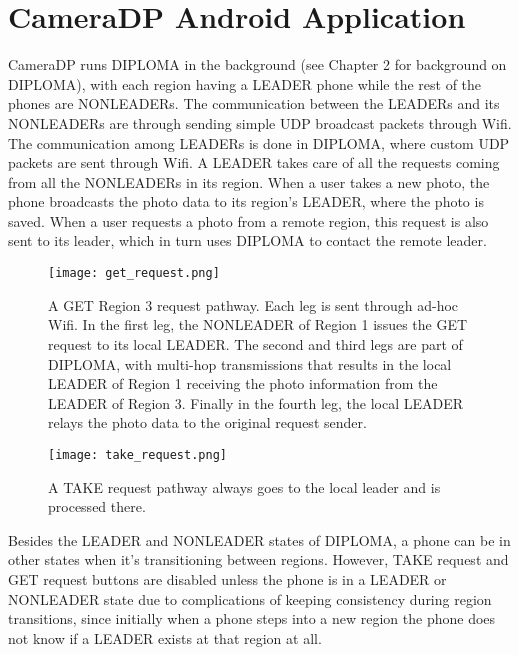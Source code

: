 \chapter{CameraDP Android Application}

CameraDP runs DIPLOMA in the background (see Chapter 2 for background on DIPLOMA), with each region having a LEADER phone while the rest of the phones are NONLEADERs. The communication between the LEADERs and its NONLEADERs are through sending simple UDP broadcast packets through Wifi. The communication among LEADERs is done in DIPLOMA, where custom UDP packets are sent through Wifi. A LEADER takes care of all the requests coming from all the NONLEADERs in its region.  When a user takes a new photo, the phone broadcasts the photo data to its region's LEADER, where the photo is saved. When a user requests a photo from a remote region, this request is also sent to its leader, which in turn uses DIPLOMA to contact the remote leader.

\begin{figure}[htb]
\begin{center}
\texttt{[image: get\_request.png]}
\caption{A GET Region 3 request pathway. Each leg is sent through ad-hoc Wifi. In the first leg, the NONLEADER of Region 1 issues the GET request to its local LEADER. The second and third legs are part of DIPLOMA, with multi-hop transmissions that results in the local LEADER of Region 1 receiving the photo information from the LEADER of Region 3. Finally in the fourth leg, the local LEADER relays the photo data to the original request sender.}
\label{fig:get-request-png}
\end{center}
\end{figure}

\begin{figure}[htb]
\begin{center}
\texttt{[image: take\_request.png]}
\caption{A TAKE request pathway always goes to the local leader and is processed there.}
\label{fig:take-request-png}
\end{center}
\end{figure}

Besides the LEADER and NONLEADER states of DIPLOMA, a phone can be in other states when it's transitioning between regions. However, TAKE request and GET request buttons are disabled unless the phone is in a LEADER or NONLEADER state due to complications of keeping consistency during region transitions, since initially when a phone steps into a new region the phone does not know if a LEADER exists at that region at all.

